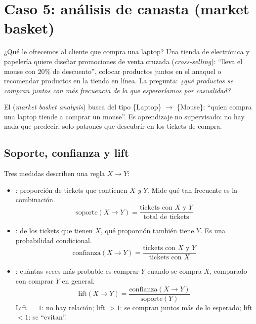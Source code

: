 \section{Caso 5: análisis de canasta (market basket)}
\label{sec:m7-canasta}

\begin{ejemplo}{¿Qué le ofrecemos al cliente que compra una laptop?}
Una tienda de electrónica y papelería quiere diseñar promociones de venta
cruzada (\emph{cross-selling}): ``lleva el mouse con 20\% de descuento'',
colocar productos juntos en el anaquel o recomendar productos en la tienda en
línea. La pregunta: \emph{¿qué productos se compran juntos con más frecuencia
de la que esperaríamos por casualidad?}
\end{ejemplo}

El  (\emph{market basket analysis}) busca
 del tipo \{Laptop\} $\rightarrow$ \{Mouse\}:
``quien compra una laptop tiende a comprar un mouse''. Es aprendizaje no
supervisado: no hay nada que predecir, solo patrones que descubrir en los
tickets de compra.

\subsection{Soporte, confianza y lift}

Tres medidas describen una regla $X \rightarrow Y$:

\begin{itemize}
  \item {}: proporción de tickets que contienen $X$ \emph{y}
        $Y$. Mide qué tan frecuente es la combinación.
        \[ \text{soporte}(X \rightarrow Y) = \frac{\text{tickets con } X \text{ y } Y}{\text{total de tickets}} \]
  \item {}: de los tickets que tienen $X$, qué proporción
        también tiene $Y$. Es una probabilidad condicional.
        \[ \text{confianza}(X \rightarrow Y) = \frac{\text{tickets con } X \text{ y } Y}{\text{tickets con } X} \]
  \item {}: cuántas veces más probable es comprar $Y$ cuando se
        compra $X$, comparado con comprar $Y$ en general.
        \[ \text{lift}(X \rightarrow Y) = \frac{\text{confianza}(X \rightarrow Y)}{\text{soporte}(Y)} \]
        Lift $= 1$: no hay relación; lift $> 1$: se compran juntos más de lo
        esperado; lift $< 1$: se ``evitan''.
\end{itemize}

